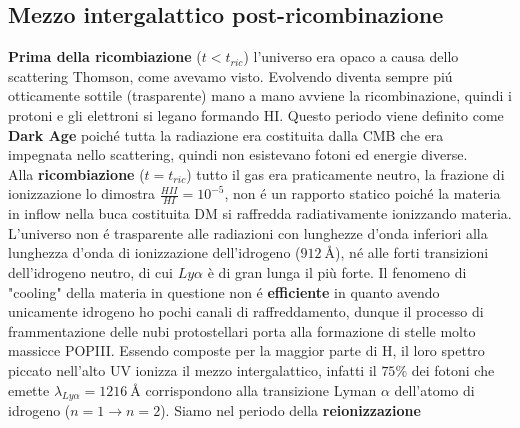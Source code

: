 \documentclass[12pt, a4paper]{article}
\begin{document}
\subsection{Mezzo intergalattico post-ricombinazione}
\textbf{Prima della ricombiazione} ($t<t_{ric}$) l'universo era opaco a causa dello scattering Thomson, come avevamo visto. Evolvendo diventa sempre pi\'{u} otticamente sottile (trasparente) mano a mano avviene la ricombinazione, quindi i protoni e gli elettroni si legano formando HI. Questo periodo viene definito come \textbf{Dark Age} poich\'{e} tutta la radiazione era costituita dalla CMB che era impegnata nello scattering, quindi non esistevano fotoni ed energie diverse.\\
Alla \textbf{ricombiazione} ($t=t_{ric}$) tutto il gas era praticamente neutro, la frazione di ionizzazione lo dimostra $\frac{HII}{HI}=10^{-5}$, non \'{e} un rapporto statico poich\'{e} la materia in inflow nella buca costituita DM si raffredda radiativamente ionizzando materia. L'universo non \'{e} trasparente alle radiazioni con lunghezze d'onda inferiori alla lunghezza d'onda di ionizzazione dell'idrogeno ($\SI{912}{\angstrom}$), né alle forti transizioni dell'idrogeno neutro, di cui $Ly\alpha$ è di gran lunga il più forte. Il fenomeno di "cooling" della materia in questione non \'{e} \textbf{efficiente} in quanto avendo unicamente idrogeno ho pochi canali di raffreddamento, dunque il processo di frammentazione delle nubi protostellari porta alla formazione di stelle molto massicce POPIII. Essendo composte per la maggior parte di H, il loro spettro piccato nell'alto UV ionizza il mezzo intergalattico, infatti il $75\%$ dei fotoni che emette $\lambda_{Ly \alpha}=\SI{1216}{\angstrom}$ corrispondono alla transizione Lyman $\alpha$ dell'atomo di idrogeno ($n=1 \rightarrow n=2$). Siamo nel periodo della \textbf{reionizzazione} 
\end{document}

